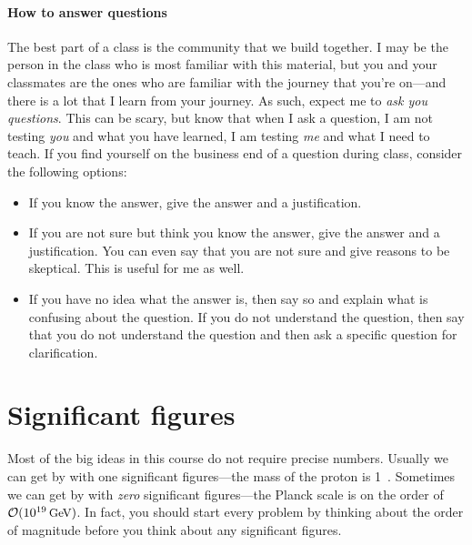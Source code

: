 \documentclass[12pt, oneside]{report}    %
\let\oldsection\section
\def\section{%
  \setcounter{sidenote}{1}%
  \oldsection
}
\begin{document}
\paragraph{How to answer questions} The best part of a class is the community that we build together. I may be the person in the class who is most familiar with this material, but you and your classmates are the ones who are familiar with the journey that you're on---and there is a lot that I learn from your journey. As such, expect me to \emph{ask you questions}. This can be scary, but know that when I ask a question, I am not testing \emph{you} and what you have learned, I am testing \emph{me} and what I need to teach. If you find yourself on the business end of a question during class, consider the following options:
\begin{itemize}
    \item If you know the answer, give the answer and a justification.
    \item If you are not sure but think you know the answer, give the answer and a justification. You can even say that you are not sure and give reasons to be skeptical. This is useful for me as well.
    \item If you have no idea what the answer is, then say so and explain what is confusing about the question. If you do not understand the question, then say that you do not understand the question and then ask a specific question for clarification. 
\end{itemize}%


\section{Significant figures}

Most of the big ideas in this course do not require precise numbers. Usually we can get by with one significant figures---the mass of the proton is 1~\GeV{}. Sometimes we can get by with \emph{zero} significant figures---the Planck scale is on the order of $\mathcal O(10^{19}\,\textnormal{{\small{GeV}}{}})$. In fact, you should start every problem by thinking about the order of magnitude before you think about any significant figures. 
\end{document}
